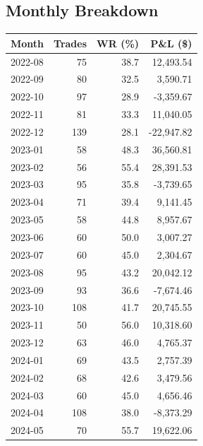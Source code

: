 \documentclass[11pt,a4paper,twoside]{article}
\begin{document}
\subsection{Monthly Breakdown}
\noindent\begin{center}
\begin{tabular}{>{\color{txtmain}}l rrr}
\toprule
\rowcolor{cardbg}
\textbf{Month} & \textbf{Trades} & \textbf{WR (\%)} & \textbf{P\&L (\$)} \\
\midrule
2022-08 & 75 & 38.7 & \textcolor{wingreen}{12,493.54} \\
2022-09 & 80 & 32.5 & \textcolor{wingreen}{3,590.71} \\
2022-10 & 97 & 28.9 & \textcolor{lossred}{-3,359.67} \\
2022-11 & 81 & 33.3 & \textcolor{wingreen}{11,040.05} \\
2022-12 & 139 & 28.1 & \textcolor{lossred}{-22,947.82} \\
2023-01 & 58 & 48.3 & \textcolor{wingreen}{36,560.81} \\
2023-02 & 56 & 55.4 & \textcolor{wingreen}{28,391.53} \\
2023-03 & 95 & 35.8 & \textcolor{lossred}{-3,739.65} \\
2023-04 & 71 & 39.4 & \textcolor{wingreen}{9,141.45} \\
2023-05 & 58 & 44.8 & \textcolor{wingreen}{8,957.67} \\
2023-06 & 60 & 50.0 & \textcolor{wingreen}{3,007.27} \\
2023-07 & 60 & 45.0 & \textcolor{wingreen}{2,304.67} \\
2023-08 & 95 & 43.2 & \textcolor{wingreen}{20,042.12} \\
2023-09 & 93 & 36.6 & \textcolor{lossred}{-7,674.46} \\
2023-10 & 108 & 41.7 & \textcolor{wingreen}{20,745.55} \\
2023-11 & 50 & 56.0 & \textcolor{wingreen}{10,318.60} \\
2023-12 & 63 & 46.0 & \textcolor{wingreen}{4,765.37} \\
2024-01 & 69 & 43.5 & \textcolor{wingreen}{2,757.39} \\
2024-02 & 68 & 42.6 & \textcolor{wingreen}{3,479.56} \\
2024-03 & 60 & 45.0 & \textcolor{wingreen}{4,656.46} \\
2024-04 & 108 & 38.0 & \textcolor{lossred}{-8,373.29} \\
2024-05 & 70 & 55.7 & \textcolor{wingreen}{19,622.06} \\

\end{tabular}
\end{center}
\end{document}
